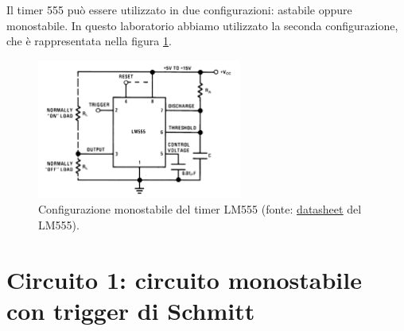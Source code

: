 \documentclass{report}
\begin{document}
Il timer 555 può essere utilizzato in due configurazioni: astabile oppure monostabile. In questo laboratorio abbiamo utilizzato la seconda configurazione, che è rappresentata nella figura \ref{figura:timer2}.
\begin{figure}[h!]
	\centering
	\includegraphics[height=4.6cm]{immagini/timer3}
	\caption{Configurazione monostabile del timer LM555 (fonte: \textcolor{blue}{\underline{\href{https://www.ti.com/lit/ds/symlink/lm555.pdf?ts=1667144089940&ref_url=https\%253A\%252F\%252Fwww.ti.com\%252Fproduct\%252FLM555}{datasheet}}} del LM555).}
	\label{figura:timer2}
\end{figure}

\newpage
\section{Circuito 1: circuito monostabile con trigger di Schmitt}
\end{document}
